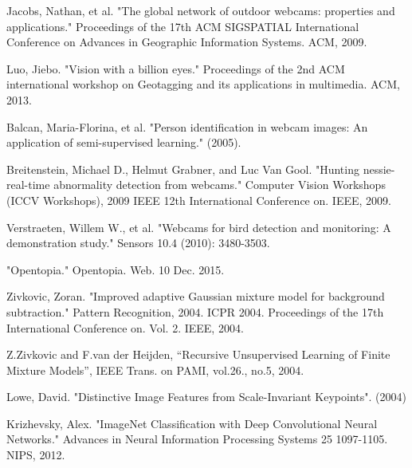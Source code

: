 \documentclass[10pt]{article} %
\begin{document}
\begin{thebibliography}{10}
Jacobs, Nathan, et al. "The global network of outdoor webcams: properties and applications." Proceedings of the 17th ACM SIGSPATIAL International Conference on Advances in Geographic Information Systems. ACM, 2009.

Luo, Jiebo. "Vision with a billion eyes." Proceedings of the 2nd ACM international workshop on Geotagging and its applications in multimedia. ACM, 2013.

Balcan, Maria-Florina, et al. "Person identification in webcam images: An application of semi-supervised learning." (2005).

Breitenstein, Michael D., Helmut Grabner, and Luc Van Gool. "Hunting nessie-real-time abnormality detection from webcams." Computer Vision Workshops (ICCV Workshops), 2009 IEEE 12th International Conference on. IEEE, 2009.

Verstraeten, Willem W., et al. "Webcams for bird detection and monitoring: A demonstration study." Sensors 10.4 (2010): 3480-3503.

"Opentopia." Opentopia. Web. 10 Dec. 2015.

Zivkovic, Zoran. "Improved adaptive Gaussian mixture model for background subtraction." Pattern Recognition, 2004. ICPR 2004. Proceedings of the 17th International Conference on. Vol. 2. IEEE, 2004.

Z.Zivkovic and F.van der Heijden, “Recursive Unsupervised Learning of Finite Mixture Models”, IEEE Trans. on PAMI, vol.26., no.5, 2004.

Lowe, David. "Distinctive Image Features from Scale-Invariant Keypoints". (2004)

Krizhevsky, Alex. "ImageNet Classification with Deep Convolutional Neural Networks." Advances in Neural Information Processing Systems 25 1097-1105. NIPS, 2012.




\end{thebibliography}
\end{document}
